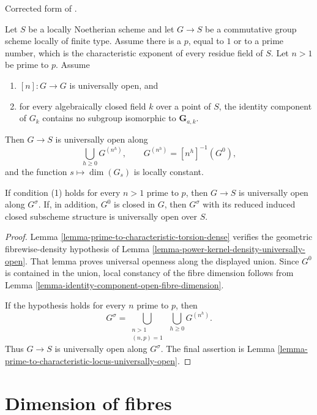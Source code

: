 \begin{lemma}
\label{corollary-prime-to-characteristic-component-openness}
\begin{reference}
Corrected form of \cite[Expos\'e 236, Corollary 1.5, pp. 227--228]{FGA}.
\end{reference}
Let $S$ be a locally Noetherian scheme and let $G \to S$ be a commutative
group scheme locally of finite type. Assume there is a $p$, equal to $1$ or
to a prime number, which is the characteristic exponent of every residue
field of $S$. Let $n > 1$ be prime to $p$. Assume
\begin{enumerate}
\item $[n] : G \to G$ is universally open, and
\item for every algebraically closed field $k$ over a point of $S$, the
identity component of $G_k$ contains no subgroup isomorphic to
$\mathbf{G}_{a,k}$.
\end{enumerate}
Then $G \to S$ is universally open along
$$
\bigcup_{h \geq 0}G^{(n^h)}, \qquad
G^{(n^h)}=[n^h]^{-1}(G^0),
$$
and the function $s \mapsto \dim(G_s)$ is locally constant.

If condition (1) holds for every $n > 1$ prime to $p$, then $G \to S$ is
universally open along $G^\sigma$. If, in addition, $G^0$ is closed in $G$,
then $G^\sigma$ with its reduced induced closed subscheme structure is
universally open over $S$.
\end{lemma}

\begin{proof}
Lemma \ref{lemma-prime-to-characteristic-torsion-dense} verifies the
geometric fibrewise-density hypothesis of
Lemma \ref{lemma-power-kernel-density-universally-open}. That lemma proves
universal openness along the displayed union. Since $G^0$ is contained in
the union, local constancy of the fibre dimension follows from
Lemma \ref{lemma-identity-component-open-fibre-dimension}.

If the hypothesis holds for every $n$ prime to $p$, then
$$
G^\sigma=
\bigcup_{\substack{n>1 \\ (n,p)=1}}\ \bigcup_{h \geq 0}G^{(n^h)}.
$$
Thus $G \to S$ is universally open along $G^\sigma$. The final assertion is
Lemma \ref{lemma-prime-to-characteristic-locus-universally-open}.
\end{proof}






\section{Dimension of fibres}
\label{section-dimension}

